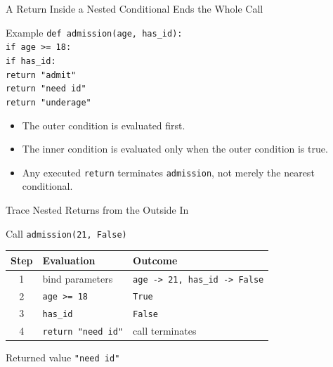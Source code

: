 \documentclass[aspectratio=169,10pt]{beamer}
\begin{document}

\begin{frame}{A Return Inside a Nested Conditional Ends the Whole Call}
  \begin{block}{Example}
    \texttt{def admission(age, has\_id):}\\
    \hspace*{0.20in}\texttt{if age >= 18:}\\
    \hspace*{0.40in}\texttt{if has\_id:}\\
    \hspace*{0.60in}\texttt{return "admit"}\\
    \hspace*{0.40in}\texttt{return "need id"}\\
    \hspace*{0.20in}\texttt{return "underage"}
  \end{block}

  \begin{itemize}
    \item The outer condition is evaluated first.
    \item The inner condition is evaluated only when the outer condition is true.
    \item Any executed \texttt{return} terminates \texttt{admission}, not merely the nearest conditional.
  \end{itemize}
\end{frame}

\begin{frame}{Trace Nested Returns from the Outside In}
  \begin{block}{Call}
    \centering
    \Large\texttt{admission(21, False)}
  \end{block}

  \begin{center}
    \renewcommand{\arraystretch}{1.18}
    \begin{tabular}{c|l|l}
      \textbf{Step} & \textbf{Evaluation} & \textbf{Outcome} \\\hline
      1 & bind parameters & \texttt{age -> 21, has\_id -> False} \\
      2 & \texttt{age >= 18} & \texttt{True} \\
      3 & \texttt{has\_id} & \texttt{False} \\
      4 & \texttt{return "need id"} & call terminates
    \end{tabular}
  \end{center}

  \begin{block}{Returned value}
    \centering
    \texttt{"need id"}
  \end{block}
\end{frame}
\end{document}
